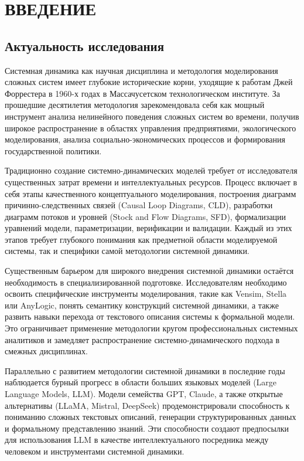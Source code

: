 
\chapter*{ВВЕДЕНИЕ}

\section*{Актуальность исследования}

Системная динамика как научная дисциплина и методология моделирования сложных систем имеет глубокие исторические корни, уходящие к работам Джей Форрестера в 1960-х годах в Массачусетском технологическом институте. За прошедшие десятилетия методология зарекомендовала себя как мощный инструмент анализа нелинейного поведения сложных систем во времени, получив широкое распространение в областях управления предприятиями, экологического моделирования, анализа социально-экономических процессов и формирования государственной политики.

Традиционно создание системно-динамических моделей требует от исследователя существенных затрат времени и интеллектуальных ресурсов. Процесс включает в себя этапы качественного концептуального моделирования, построения диаграмм причинно-следственных связей (Causal Loop Diagrams, CLD), разработки диаграмм потоков и уровней (Stock and Flow Diagrams, SFD), формализации уравнений модели, параметризации, верификации и валидации. Каждый из этих этапов требует глубокого понимания как предметной области моделируемой системы, так и специфики самой методологии системной динамики.

Существенным барьером для широкого внедрения системной динамики остаётся необходимость в специализированной подготовке. Исследователям необходимо освоить специфические инструменты моделирования, такие как Vensim, Stella или AnyLogic, понять семантику конструкций системной динамики, а также развить навыки перехода от текстового описания системы к формальной модели. Это ограничивает применение методологии кругом профессиональных системных аналитиков и замедляет распространение системно-динамического подхода в смежных дисциплинах.

Параллельно с развитием методологии системной динамики в последние годы наблюдается бурный прогресс в области больших языковых моделей (Large Language Models, LLM). Модели семейства GPT, Claude, а также открытые альтернативы (LLaMA, Mistral, DeepSeek) продемонстрировали способность к пониманию сложных текстовых описаний, генерации структурированных данных и формальному представлению знаний. Эти способности создают предпосылки для использования LLM в качестве интеллектуального посредника между человеком и инструментами системной динамики.

